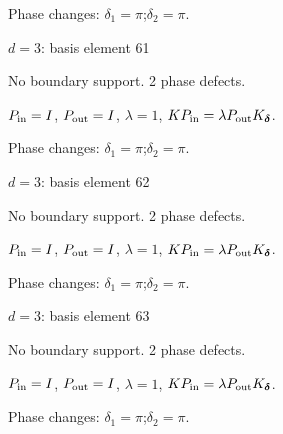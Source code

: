 \par\smallskip\begin{minipage}{.98\linewidth}\small Phase changes: $\delta_{1}=\pi$;\quad $\delta_{2}=\pi$.\end{minipage}
\vfill
{\footnotesize\texttt{}}
\newpage
{}
{\Large $d=3$: basis element 61}\par
No boundary support. 2 phase defects.
\begin{center}
\end{center}
\vspace{-1mm}
$P_{\rm in}=I$, \quad $P_{\rm out}=I$, \quad $\lambda=1$, \qquad $K P_{\rm in}=\lambda P_{\rm out}K_{\boldsymbol\delta}$.
\par\smallskip\begin{minipage}{.98\linewidth}\small Phase changes: $\delta_{1}=\pi$;\quad $\delta_{2}=\pi$.\end{minipage}
\vfill
{\footnotesize\texttt{}}
\newpage
{}
{\Large $d=3$: basis element 62}\par
No boundary support. 2 phase defects.
\begin{center}
\end{center}
\vspace{-1mm}
$P_{\rm in}=I$, \quad $P_{\rm out}=I$, \quad $\lambda=1$, \qquad $K P_{\rm in}=\lambda P_{\rm out}K_{\boldsymbol\delta}$.
\par\smallskip\begin{minipage}{.98\linewidth}\small Phase changes: $\delta_{1}=\pi$;\quad $\delta_{2}=\pi$.\end{minipage}
\vfill
{\footnotesize\texttt{}}
\newpage
{}
{\Large $d=3$: basis element 63}\par
No boundary support. 2 phase defects.
\begin{center}
\end{center}
\vspace{-1mm}
$P_{\rm in}=I$, \quad $P_{\rm out}=I$, \quad $\lambda=1$, \qquad $K P_{\rm in}=\lambda P_{\rm out}K_{\boldsymbol\delta}$.
\par\smallskip\begin{minipage}{.98\linewidth}\small Phase changes: $\delta_{1}=\pi$;\quad $\delta_{2}=\pi$.\end{minipage}
